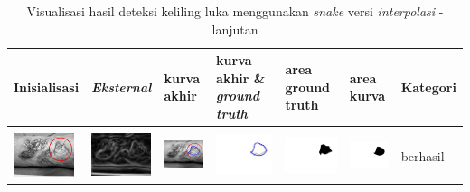 \begin{table}[H]
	\centering
	\caption{Visualisasi hasil deteksi keliling luka menggunakan \emph{snake} versi \emph{interpolasi} - lanjutan}
	\label{tabel_hasil_5_interp}
	\begin{tabular}{|m{0.7in}|m{0.7in}|m{0.7in}|m{0.7in}|m{0.7in}|m{0.7in}|m{0.7in}|}
		\hline
		\textbf{Inisialisasi} & \textbf{\emph{Eksternal}} & \textbf{kurva akhir} & \textbf{kurva akhir \& \emph{ground truth}}& \textbf{area ground truth} & \textbf{area kurva} & \textbf{Kategori} \\
		\hline
		
		&  &  & & & &  \\
		\includegraphics[width=0.7in]{dataset/dataset_3/luka_kuning/ready/13_interp_init.jpg}&
		\includegraphics[width=0.7in]{dataset/dataset_3/luka_kuning/ready/13_interp_ext.jpg}&
		\includegraphics[width=0.7in]{dataset/dataset_3/luka_kuning/ready/13_interp_result.jpg}&
		\includegraphics[width=0.7in]{dataset/dataset_3/luka_kuning/ready/13_gt_r.jpg}&
		\includegraphics[width=0.7in]{dataset/dataset_3/luka_kuning/ready/13_r.jpg}&
		\includegraphics[width=0.7in]{dataset/dataset_3/luka_kuning/ready/13_interp_r.jpg}&
		berhasil\\
		\hline
		

\end{tabular}
\end{table}
